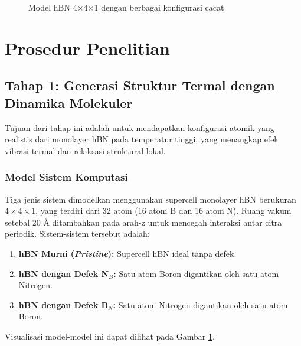 \begin{figure}[htbp]
    \caption{Model hBN 4$\times$4$\times$1 dengan berbagai konfigurasi cacat}
    \label{fig:struktur_hBN_4x4x1}
\end{figure}

\section{Prosedur Penelitian}

\subsection{Tahap 1: Generasi Struktur Termal dengan Dinamika Molekuler}
Tujuan dari tahap ini adalah untuk mendapatkan konfigurasi atomik yang realistis dari monolayer hBN pada temperatur tinggi, yang menangkap efek vibrasi termal dan relaksasi struktural lokal.
\subsubsection{Model Sistem Komputasi}
Tiga jenis sistem dimodelkan menggunakan supercell monolayer hBN berukuran $4 \times 4 \times 1$, yang terdiri dari 32 atom (16 atom B dan 16 atom N).
Ruang vakum setebal 20 Å ditambahkan pada arah-z untuk mencegah interaksi antar citra periodik.
Sistem-sistem tersebut adalah:
\begin{enumerate}
    \item \textbf{hBN Murni (\textit{Pristine}):} Supercell hBN ideal tanpa defek.
\item \textbf{hBN dengan Defek N$_B$:} Satu atom Boron digantikan oleh satu atom Nitrogen.
\item \textbf{hBN dengan Defek B$_N$:} Satu atom Nitrogen digantikan oleh satu atom Boron.
\end{enumerate}
Visualisasi model-model ini dapat dilihat pada Gambar \ref{fig:struktur_hBN_4x4x1}.

